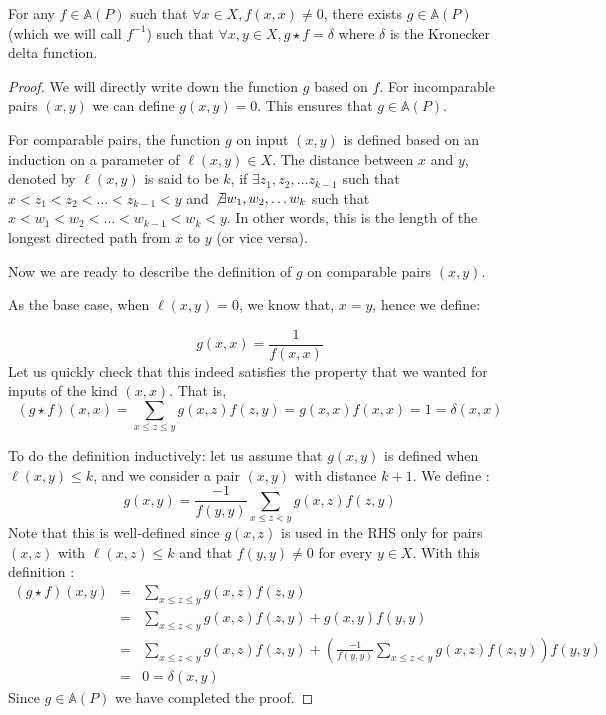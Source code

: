 \begin{lemma}
For any $f \in \mathbb{A}(P)$ such that $\forall x \in X, f(x,x) \ne 0$, there exists $g \in \mathbb{A}(P)$ (which we will call $f^{-1}$) such that $\forall x,y \in X, g \star f = \delta$ where $\delta$ is the Kronecker delta function.
\end{lemma}
\begin{proof}
We will directly write down the function $g$ based on $f$. For incomparable pairs $(x,y)$ we can define $g(x,y) = 0$. This ensures that $g \in \mathbb{A}(P)$. 

For comparable pairs, the function $g$ on input $(x,y)$ is defined based on an induction on a parameter of $\ell(x,y) \in X$. The distance between $x$ and $y$, denoted by $\ell(x,y)$ is said to be $k$, if $\exists z_1, z_2, \ldots z_{k-1}$ such that $x < z_1 < z_2 < \ldots < z_{k-1} < y$ and $\not\exists w_1, w_2, \ldots w_k$ such that $x < w_1 < w_2 < \ldots < w_{k-1} < w_k < y$. In other words, this is the length of the longest directed path from $x$ to $y$ (or vice versa).

Now we are ready to describe the definition of $g$ on comparable pairs $(x,y)$. 

As the base case, when $\ell(x,y) = 0$, we know that, $x=y$, hence we define:

$$g(x,x) = \frac{1}{f(x,x)}$$
Let us quickly check that this indeed satisfies the property that we wanted for inputs of the kind $(x,x)$. That is,
$$(g \star f) (x,x) = \sum_{x \le z \le y} g(x,z)f(z,y) = g(x,x)f(x,x) = 1 = \delta(x,x)$$

To do the definition inductively: let us assume that $g(x,y)$ is defined when $\ell(x,y) \le k$, and we consider a pair $(x,y)$ with distance $k+1$. We define :
$$g(x,y) = \frac{-1}{f(y,y)}\sum_{x \le z < y} g(x,z)f(z,y)$$
Note that this is well-defined since $g(x,z)$ is used in the RHS only for pairs $(x,z)$ with $\ell(x,z) \le k$ and that $f(y,y) \ne 0$ for every $y \in X$.
With this definition :
\begin{eqnarray*}
(g \star f) (x,y) & = & \sum_{x \le z \le y} g(x,z)f(z,y)\\
& = & \sum_{x \le z < y} g(x,z)f(z,y) + g(x,y)f(y,y)\\
& = & \sum_{x \le z < y} g(x,z)f(z,y) + \left(\frac{-1}{f(y,y)}\sum_{x \le z < y} g(x,z)f(z,y)\right) f(y,y) \\
& = & 0 = \delta(x,y)
\end{eqnarray*}
Since $g \in \mathbb{A}(P)$ we have completed the proof.
\end{proof}


